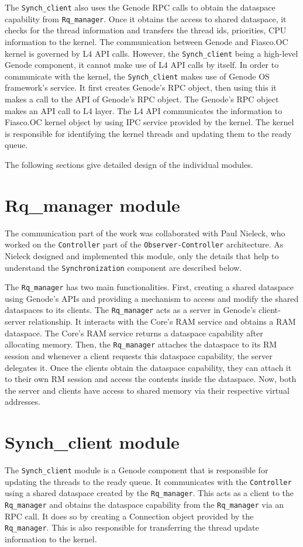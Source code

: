 The \texttt{Synch\_client} also uses the Genode RPC calls to obtain the dataspace capability from \texttt{Rq\_manager}. Once it obtains the access to shared dataspace, it checks for the thread information and transfers the thread ids, priorities, CPU information to the kernel. The communication between Genode and Fiasco.OC kernel is governed by L4 API calls. However, the \texttt{Synch\_client} being a high-level Genode component, it cannot make use of L4 API calls by itself. In order to communicate with the kernel, the \texttt{Synch\_client} makes use of Genode OS framework's service. It first creates Genode's RPC object, then using this it makes a call to the API of Genode's RPC object. The Genode's RPC object makes an API call to L4 layer. The L4 API communicates the information to Fiasco.OC kernel object by using IPC service provided by the kernel. The kernel is responsible for identifying the kernel threads and updating them to the ready queue.

The following sections give detailed design of the individual modules.

\section{Rq\_manager module}\label{rqmodule}
The communication part of the work was collaborated with Paul Nieleck, who worked on the \texttt{Controller} part of the \texttt{Observer-Controller} architecture\cite{paul}. As Nieleck designed and implemented this module, only the details that help to understand the \texttt{Synchronization} component are described below. 

The \texttt{Rq\_manager} has two main functionalities. First, creating a shared dataspace using Genode's APIs and providing a mechanism to access and modify the shared dataspaces to its clients. The \texttt{Rq\_manager} acts as a server in Genode's client-server relationship. It interacts with the Core's RAM service and obtains a RAM dataspace. The Core’s RAM service returns a dataspace capability after allocating memory. Then, the \texttt{Rq\_manager} attaches the dataspace to its RM session and whenever a client requests this dataspace capability, the server delegates it. Once the clients obtain the dataspace capability, they can attach it to their own RM session and access the contents inside the dataspace. Now, both the server and clients have access to shared memory via their respective virtual addresses.

\section{Synch\_client module}
The \texttt{Synch\_client} module is a Genode component that is responsible for updating the threads to the ready queue. It communicates with the \texttt{Controller} using a shared dataspace created by the \texttt{Rq\_manager}. This acts as a client to the \texttt{Rq\_manager} and obtains the dataspace capability from the \texttt{Rq\_manager} via an RPC call. It does so by creating a Connection object provided by the \texttt{Rq\_manager}. This is also responsible for transferring the thread update information to the kernel.

